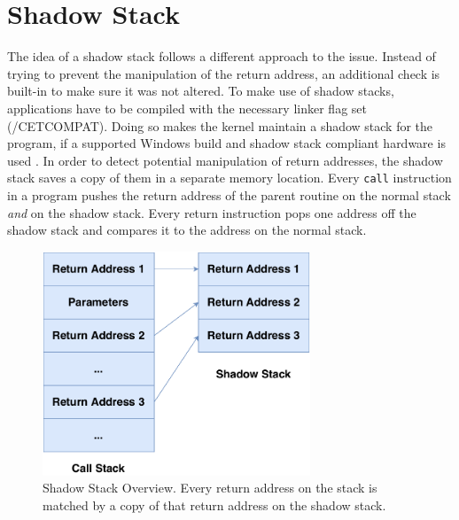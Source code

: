 \documentclass[10pt,twocolumn,a4paper]{article}
\begin{document}
\section{Shadow Stack}\label{shadowstack}
The idea of a shadow stack follows a different approach to the issue.
Instead of trying to prevent the manipulation of the return address, an additional check is built-in to make sure it was not altered.
To make use of shadow stacks, applications have to be compiled with the necessary linker flag set (/CETCOMPAT).
Doing so makes the kernel maintain a shadow stack for the program, if a supported Windows build and shadow stack compliant hardware is used \cite{kernel}.
In order to detect potential manipulation of return addresses, the shadow stack saves a copy of them in a separate memory location\cite{shan}.
Every \texttt{call} instruction in a program pushes the return address of the parent routine on the normal stack \emph{and} on the shadow stack.
Every return instruction pops one address off the shadow stack and compares it to the address on the normal stack\cite{shan}.

\begin{figure}[h]
\includegraphics[keepaspectratio,width=8cm]{fig/ShadowStack}
\caption{Shadow Stack Overview. Every return address on the stack is matched by a copy of that return address on the shadow stack.}
\end{figure}
\end{document}

